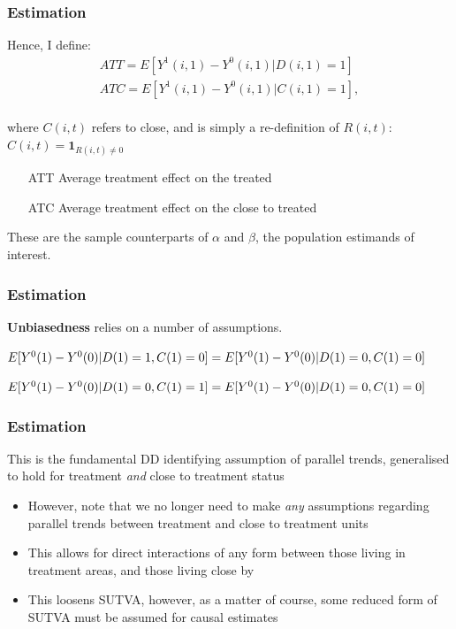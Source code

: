 \documentclass[10pt,letterpaper,subeqn]{beamer}
\begin{document}
\begin{frame}[label=estim3]
  \frametitle{Estimation}
Hence, I define:
\vspace{4mm}
\begin{eqnarray}
\label{Seqn:estimATT}
ATT=E[Y^1(i,1)-Y^0(i,1)|D(i,1)=1]\  \\
\label{Seqn:estimATC}
ATC=E[Y^1(i,1)-Y^0(i,1)|C(i,1)=1],
\end{eqnarray}
\vspace{4mm} \\
where $C(i,t)$ refers to close, and is simply a re-definition of $R(i,t)$:
$C(i,t)=\mathbf{1}_{R(i,t)\neq 0}$
\vspace{4mm} \\
\begin{enumerate}
\item[ATT] Average treatment effect on the treated
\item[ATC] Average treatment effect on the close to treated
\end{enumerate}
These are the sample counterparts of $\alpha$ and $\beta$, the population 
estimands of interest.

\end{frame}



\begin{frame}[label=estim4]
  \frametitle{Estimation}
\textbf{Unbiasedness} relies on a number of assumptions. \\
\vspace{5mm}

\begin{tcolorbox}[title =1. Parallel trends in treatment and control]
$E[Y^0(1)-Y^0(0)|D(1)=1,C(1)=0]= \\
E[Y^0(1)-Y^0(0)|D(1)=0,C(1)=0]$
\end{tcolorbox}

\begin{tcolorbox}[title =2. Parallel trends in close and control]
$E[Y^0(1)-Y^0(0)|D(1)=0,C(1)=1]= \\
E[Y^0(1)-Y^0(0)|D(1)=0,C(1)=0]$
\end{tcolorbox}

\end{frame}


\begin{frame}[label=estim5]
  \frametitle{Estimation}
This is the fundamental DD identifying assumption of parallel trends, 
generalised to hold for treatment \emph{and} close to treatment status
\vspace{4mm} \\
\begin{itemize}
\item However, note that we no longer need to make \emph{any} assumptions 
regarding parallel trends between treatment and close to treatment units
\item This allows for direct interactions of any form between those living in 
treatment areas, and those living close by
\item This loosens SUTVA, however, as a matter of course, some reduced form of 
SUTVA must be assumed for causal estimates
\end{itemize}
\end{frame}
\end{document}

